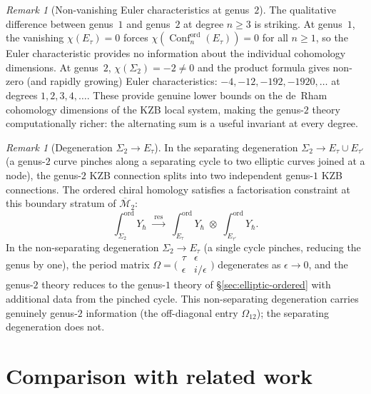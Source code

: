 \documentclass[11pt,reqno]{amsart}
\theoremstyle{definition}
\theoremstyle{remark}
\newtheorem{remark}[theorem]{Remark}
\newcommand{\cM}{\mathcal{M}}
\DeclareMathOperator{\Conf}{Conf}
\numberwithin{equation}{section}
\begin{document}
\begin{remark}[Non-vanishing Euler characteristics at
genus~$2$]
\label{rem:g2-nonvanishing-chi}
The qualitative difference between genus~$1$ and genus~$2$
at degree $n \geq 3$ is striking. At genus~$1$, the
vanishing $\chi(E_\tau) = 0$ forces
$\chi(\Conf_n^{\mathrm{ord}}(E_\tau)) = 0$ for all
$n \geq 1$, so the Euler characteristic provides no
information about the individual cohomology dimensions.
At genus~$2$, $\chi(\Sigma_2) = -2 \neq 0$ and the product
formula gives non-zero (and rapidly growing) Euler
characteristics: $-4, -12, -192, -1920, \ldots$ at degrees
$1, 2, 3, 4, \ldots$. These provide genuine lower bounds on
the de~Rham cohomology dimensions of the KZB local system,
making the genus-$2$ theory computationally richer: the
alternating sum is a useful invariant at every degree.
\end{remark}

\begin{remark}[Degeneration $\Sigma_2 \to E_\tau$]
\label{rem:g2-degeneration}
In the separating degeneration
$\Sigma_2 \to E_\tau \cup E_{\tau'}$ (a genus-$2$ curve
pinches along a separating cycle to two elliptic curves
joined at a node), the genus-$2$ KZB connection splits into
two independent genus-$1$ KZB connections.
The ordered chiral homology satisfies
a factorisation constraint at this boundary stratum of
$\overline{\cM}_2$:
\[
  \int_{\Sigma_2}^{\mathrm{ord}} Y_\hbar
  \;\xrightarrow{\;\mathrm{res}\;}\;
  \int_{E_\tau}^{\mathrm{ord}} Y_\hbar
  \;\otimes\;
  \int_{E_{\tau'}}^{\mathrm{ord}} Y_\hbar.
\]
In the non-separating degeneration $\Sigma_2 \to E_\tau$
(a single cycle pinches, reducing the genus by one),
the period matrix
$\Omega = \bigl(\begin{smallmatrix}
\tau & \epsilon \\ \epsilon & i/\epsilon
\end{smallmatrix}\bigr)$
degenerates as $\epsilon \to 0$, and the genus-$2$ theory
reduces to the genus-$1$ theory of
\S\ref{sec:elliptic-ordered} with additional data from
the pinched cycle.
This non-separating degeneration carries genuinely
genus-$2$ information (the off-diagonal entry
$\Omega_{12}$); the separating degeneration does not.
\end{remark}


\section{Comparison with related work}
\label{sec:comparison}
\end{document}
